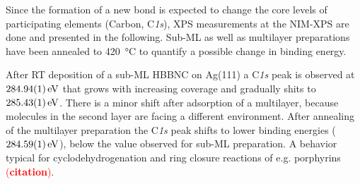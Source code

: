 
Since the formation of a new bond is expected to change the core levels of participating elements (Carbon, C\textit{1s}), XPS measurements at the NIM-XPS are done and presented in the following. Sub-ML as well as multilayer preparations have been annealed to \SI{420}{\celsius} to quantify a possible change in binding energy. 

After RT deposition of a sub-ML HBBNC on Ag(111) a C\textit{1s} peak is observed at $\SI{284,94 \pm 0.01}{\eV}$ that grows with increasing coverage and gradually shits to $\SI{285,43 \pm 0.01}{\eV}$. There is a minor shift after adsorption of a multilayer, because molecules in the second layer are facing a different environment.
After annealing of the multilayer preparation the C\textit{1s} peak shifts to lower binding energies ($\SI{284,59 \pm 0.01}{\eV}$), below the value observed for sub-ML preparation. A behavior typical for cyclodehydrogenation and ring closure reactions of e.g. porphyrins \textcolor{red}{(\textbf{citation})}.

